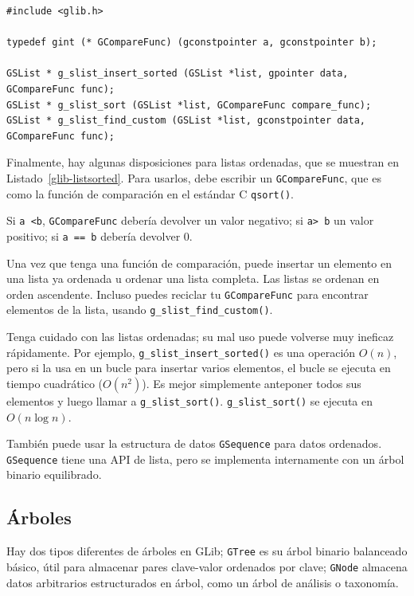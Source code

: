 \begin{lstlisting}[float, caption={Sorted lists}, label=glib-listsorted]
#include <glib.h>

typedef gint (* GCompareFunc) (gconstpointer a, gconstpointer b);

GSList * g_slist_insert_sorted (GSList *list, gpointer data, GCompareFunc func);
GSList * g_slist_sort (GSList *list, GCompareFunc compare_func);
GSList * g_slist_find_custom (GSList *list, gconstpointer data, GCompareFunc func);
\end{lstlisting}

Finalmente, hay algunas disposiciones para listas ordenadas, que se muestran en Listado~\ref{glib-listsorted}. Para usarlos, debe escribir un \lstinline{GCompareFunc}, que es como la función de comparación en el estándar C \lstinline{qsort()}.

Si \lstinline{a <b}, \lstinline{GCompareFunc} debería devolver un valor negativo; si \lstinline{a> b} un valor positivo; si \lstinline{a == b} debería devolver 0.

Una vez que tenga una función de comparación, puede insertar un elemento en una lista ya ordenada u ordenar una lista completa. Las listas se ordenan en orden ascendente. Incluso puedes reciclar tu \lstinline{GCompareFunc} para encontrar elementos de la lista, usando \lstinline{g_slist_find_custom()}.

Tenga cuidado con las listas ordenadas; su mal uso puede volverse muy ineficaz rápidamente. Por ejemplo, \lstinline{g_slist_insert_sorted()} es una operación $O(n)$, pero si la usa en un bucle para insertar varios elementos, el bucle se ejecuta en tiempo cuadrático ($O(n^2)$). Es mejor simplemente anteponer todos sus elementos y luego llamar a \lstinline{g_slist_sort()}. \lstinline{g_slist_sort()} se ejecuta en $O(n\log n)$.

También puede usar la estructura de datos \lstinline{GSequence} para datos ordenados. \lstinline{GSequence} tiene una API de lista, pero se implementa internamente con un árbol binario equilibrado.

\subsection{Árboles}

Hay dos tipos diferentes de árboles en GLib; \lstinline{GTree} es su árbol binario balanceado básico, útil para almacenar pares clave-valor ordenados por clave; \lstinline{GNode} almacena datos arbitrarios estructurados en árbol, como un árbol de análisis o taxonomía.

